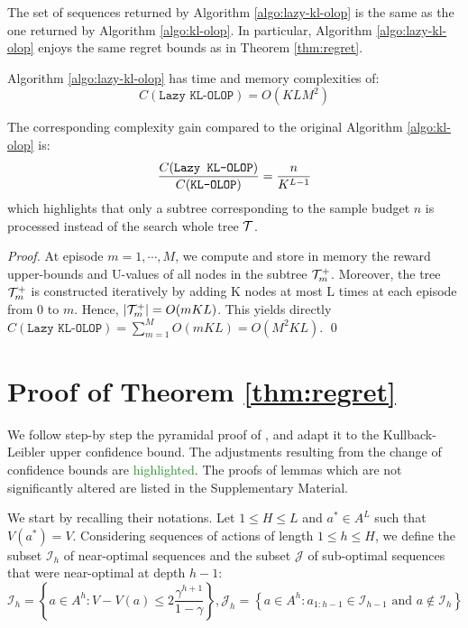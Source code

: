 \documentclass[runningheads, envcountsame, a4paper]{llncs}
\newcommand{\citep}{\cite}
\newcommand{\diff}[1]{\textcolor{ForestGreen}{#1}}
\begin{document}
\begin{theorem}[Consistency]
\label{thm:consistency}
The set of sequences returned by Algorithm \ref{algo:lazy-kl-olop} is the same as the one returned by Algorithm \ref{algo:kl-olop}.
In particular, Algorithm \ref{algo:lazy-kl-olop} enjoys the same regret bounds as in Theorem \ref{thm:regret}.
\end{theorem}

\begin{property}
Algorithm \ref{algo:lazy-kl-olop} has time and memory complexities of:
\begin{equation*}
    C(\texttt{Lazy KL-OLOP}) = O(KLM^2)
\end{equation*}

The corresponding complexity gain compared to the original Algorithm \ref{algo:kl-olop} is: 
\begin{equation*}
    \frac{C(\texttt{Lazy KL-OLOP})}{C(\texttt{KL-OLOP})} = \frac{n}{K^{L-1}}
\end{equation*}
which highlights that only a subtree corresponding to the sample budget $n$ is processed instead of the search whole tree $\mathcal{T}$.
\end{property}
\begin{proof}
At episode $m = 1, \cdots, M$, we compute and store in memory the reward upper-bounds and U-values of all nodes in the subtree $\mathcal{T}_m^+$. Moreover, the tree $\mathcal{T}_m^+$ is constructed iteratively by adding K nodes at most L times at each episode from 0 to $m$. Hence, $|\mathcal{T}_m^+| = O(mKL)$.
This yields directly $C(\texttt{Lazy KL-OLOP}) = \sum_{m=1}^M O(mKL) = O(M^2KL)$.
\qed
\end{proof}

\section{Proof of Theorem \ref{thm:regret}}
\label{sec:regret-proof}


We follow step-by step the pyramidal proof of \citep{Bubeck2010}, and adapt it to the Kullback-Leibler upper confidence bound. The adjustments resulting from the change of confidence bounds are \diff{highlighted}. The proofs of lemmas which are not significantly altered are listed in the Supplementary Material. 

We start by recalling their notations.
Let $1 \leq H \leq L$ and $a^* \in A^L$ such that $V(a^*) = V$.
Considering sequences of actions of length $1 \leq h \leq H$, we define the subset $\mathcal{I}_h$ of near-optimal sequences and the subset $\mathcal{J}$ of sub-optimal sequences that were near-optimal at depth $h-1$:
\begin{equation*}
    \mathcal{I}_h = \left\{a \in A^h: V - V(a) \leq 2\frac{\gamma^{h+1}}{1-\gamma}\right\}, \mathcal{J}_h = \left\{a \in A^h: a_{1:h-1} \in \mathcal{I}_{h-1} \text{ and } a \not\in \mathcal{I}_h\right\}
\end{equation*}
\end{document}
